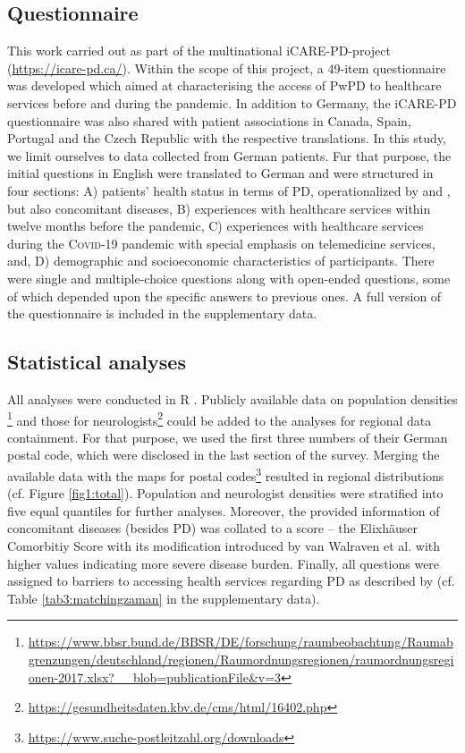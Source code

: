 \documentclass[a4paper,oneside,11pt,english]{scrartcl}
\begin{document}
\subsection*{Questionnaire}
This work carried out as part of the multinational iCARE-\textsc{PD}-project (\url{https://icare-pd.ca/}). Within the scope of this project, a 49-item questionnaire was developed which aimed at characterising the access of Pw\textsc{PD} to healthcare services before and during the pandemic. In addition to Germany, the iCARE-\textsc{PD} questionnaire was also shared with patient associations in Canada, Spain, Portugal and the Czech Republic with the respective translations. In this study, we limit ourselves to data collected from German patients. Fur that purpose, the initial questions in English were translated to German and were structured in four sections: A) patients' health status in terms of \textsc{PD}, operationalized by \cite{hoenn1967parkinsonism} and \cite{jenkinson1997pdq}, but also  concomitant diseases, B) experiences with healthcare services within twelve months before the pandemic, C) experiences with healthcare services during the \textsc{Covid}-19 pandemic with special emphasis on telemedicine services, and, D) demographic and socioeconomic characteristics of participants. There were single and multiple-choice questions along with open-ended questions, some of which depended upon the specific answers to previous ones. A full version of the questionnaire is included in the supplementary data. 

\subsection*{Statistical analyses}
All analyses were conducted in R \cite{rcore}. Publicly available data on population densities \footnote{\url{https://www.bbsr.bund.de/BBSR/DE/forschung/raumbeobachtung/Raumabgrenzungen/deutschland/regionen/Raumordnungsregionen/raumordnungsregionen-2017.xlsx?\_\_blob=publicationFile\&v=3}} and those for neurologists\footnote{\url{https://gesundheitsdaten.kbv.de/cms/html/16402.php}} could be added to the analyses for regional data containment. For that purpose, we used the first three numbers of their German postal code, which were disclosed in the last section of the survey. Merging the available data with the maps for postal codes\footnote{\url{https://www.suche-postleitzahl.org/downloads}} resulted in regional distributions (cf. Figure \ref{fig1:total}). Population and neurologist densities were stratified into five equal quantiles for further analyses. Moreover, the provided information of concomitant diseases (besides \textsc{PD}) was collated to a score -- the Elixhäuser Comorbitiy Score with its modification introduced by van Walraven et al. \cite{van2009modification} with higher values indicating more severe disease burden. Finally, all questions were assigned to barriers to accessing health services regarding \textsc{PD} as described by \cite{zaman2021barriers} (cf. Table \ref{tab3:matchingzaman} in the supplementary data).
\end{document}

